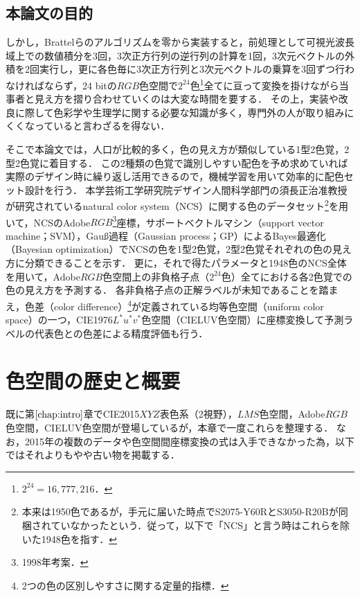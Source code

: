 \documentclass[uplatex,paper=a4,fontsize=4.0truemm,jafontsize=4.0truemm,head_space=30.0truemm,foot_space=30.0truemm,baselineskip=8.0truemm,line_length=40zw,gutter=25.0truemm,oneside,openany,fleqn,hanging_panctuation,open_bracket_pos=nibu_tentsuki,dvipdfmx,jis2004,book,titlepage]{jlreq}
\theoremstyle{mystyle}
\newcommand{\mathdisplaystyle}[1]{\(\displaystyle{#1}\)}
\newcommand{\Reference}[1]{\mathdisplaystyle{\ref{#1}}}
\begin{document}
		\section{本論文の目的}
			しかし，Brattelらのアルゴリズムを零から実装すると，前処理として可視光波長域上での数値積分を3回，3次正方行列の逆行列の計算を1回，3次元ベクトルの外積を2回実行し，更に各色毎に3次正方行列と3次元ベクトルの乗算を3回ずつ行わなければならず，24 bitの\mathdisplaystyle{RGB}色空間で\mathdisplaystyle{2^{24}}色\footnote{\mathdisplaystyle{2^{24}=16{,}777{,}216}．}全てに亘って変換を掛けながら当事者と見え方を摺り合わせていくのは大変な時間を要する．
			その上，実装や改良に際して色彩学や生理学に関する必要な知識が多く，専門外の人が取り組みにくくなっていると言わざるを得ない．

			そこで本論文では，人口が比較的多く，色の見え方が類似している1型2色覚，2型2色覚に着目する．
			この2種類の色覚で識別しやすい配色を予め求めていれば実際のデザイン時に繰り返し活用できるので，機械学習を用いて効率的に配色セット設計を行う．
			本学芸術工学研究院デザイン人間科学部門の須長正治准教授が研究されているnatural color system（NCS）に関する色のデータセット\footnote{本来は1950色であるが，手元に届いた時点でS2075-Y60RとS3050-R20Bが同梱されていなかったという．従って，以下で「NCS」と言う時はこれらを除いた1948色を指す．}を用いて，NCSのAdobe\mathdisplaystyle{RGB}\footnote{1998年考案．}座標，サポートベクトルマシン（support vector machine；SVM），Gauß過程（Gaussian process；GP）によるBayes最適化（Bayesian optimization）でNCSの色を1型2色覚，2型2色覚それぞれの色の見え方に分類できることを示す．
			更に，それで得たパラメータと1948色のNCS全体を用いて，Adobe\mathdisplaystyle{RGB}色空間上の非負格子点（\mathdisplaystyle{2^{24}}色）全てにおける各2色覚での色の見え方を予測する．
			各非負格子点の正解ラベルが未知であることを踏まえ，色差（color difference）\footnote{2つの色の区別しやすさに関する定量的指標．}が定義されている均等色空間（uniform color space）の一つ，CIE1976\mathdisplaystyle{L^\ast u^\ast v^\ast}色空間（CIELUV色空間）\cite[p.~64]{Yaguchi2017b}に座標変換して予測ラベルの代表色との色差による精度評価も行う．
	\chapter{色空間の歴史と概要}
		既に第\Reference{chap:intro}章でCIE2015\mathdisplaystyle{XYZ}表色系（2\textdegree 視野），\mathdisplaystyle{LMS}色空間，Adobe\mathdisplaystyle{RGB}色空間，CIELUV色空間が登場しているが，本章で一度これらを整理する．
		なお，2015年の複数のデータや色空間間座標変換の式は入手できなかった為，以下ではそれよりもやや古い物を掲載する．
\end{document}
